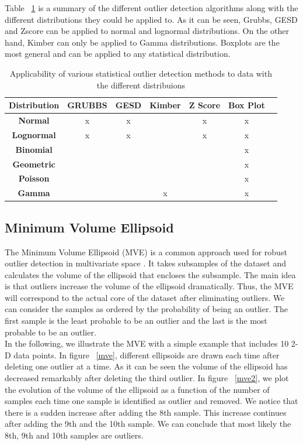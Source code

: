 Table ~\ref{dico} is a summary of the different outlier detection algorithms along with the different  distributions they could be applied to. As it can be seen, Grubbs, GESD and Zscore can be applied to normal and lognormal distributions. On the other hand, Kimber can only be applied to Gamma distributions. Boxplots are the most general and can be applied to any statistical distribution.\\

\begin{table}[h!]
	\centering
	\caption{Applicability of various statistical outlier detection methods to data with the different distribuions}
	\begin{tabular}{|c|c|c|c|c|c |p{3cm}|} 
		\hline
		\textbf{Distribution} & \textbf{GRUBBS} & 	\textbf{GESD} &	\textbf{Kimber} & \textbf{Z Score} &	\textbf{Box Plot}  \\ [0.5ex] 
		\hline\hline
		\textbf{Normal} & x &x& &x&x \\
		\hline
		\textbf{Lognormal} & x &x& &x&x  \\
		\hline
		\textbf{Binomial} & & & & & x  \\
		\hline
		\textbf{Geometric} & & & & & x  \\ 
		\hline
		\textbf{Poisson} & & & & & x  \\
		\hline
		\textbf{Gamma} & & &x & & x  \\
		\hline
	\end{tabular}
	\label{dico}
\end{table}

\subsection{Minimum Volume Ellipsoid}
The Minimum Volume Ellipsoid (MVE) is a common approach used for robust outlier detection in multivariate space  \cite{mve}. It takes subsamples of the dataset and calculates the volume of the ellipsoid that encloses the subsample. The main idea is that outliers increase the volume of the ellipsoid dramatically. Thus, the MVE will correspond to the actual core of the dataset after eliminating outliers. We can consider the samples as ordered by the probability of being an outlier. The first sample is the least probable to be an outlier and the last is the most probable to be an outlier.\\
\indent In the following, we illustrate the MVE with a simple example that includes 10 2-D data points. In figure ~\ref{mve}, different ellipsoids are drawn each time after deleting one outlier at a time. As it can be seen the volume of the ellipsoid has decreased remarkably after deleting the third outlier. In figure ~\ref{mve2}, we plot the evolution of the volume of the ellipsoid as a function of the number of samples each time one sample is identified as outlier and removed. We notice that there is a sudden increase after adding the 8th sample. This increase continues after adding the 9th and the 10th sample. We can conclude that most likely the 8th, 9th and 10th samples are outliers.\\



